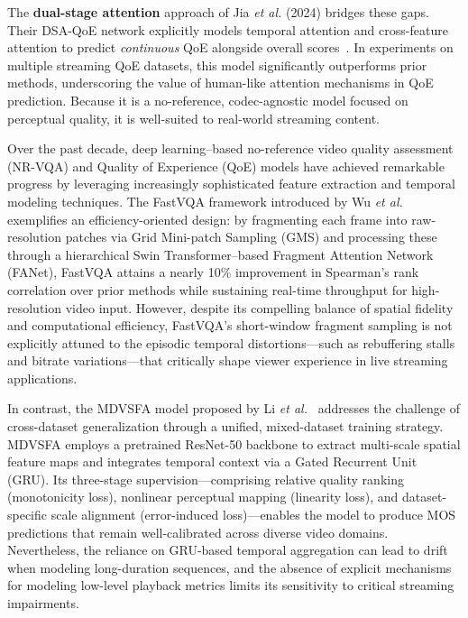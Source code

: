 The \textbf{dual-stage attention} approach of Jia \textit{et al.} (2024) bridges these gaps. Their DSA-QoE network explicitly models temporal attention and cross-feature attention to predict \textit{continuous} QoE alongside overall scores~\cite{jia2024continuous}. In experiments on multiple streaming QoE datasets, this model significantly outperforms prior methods, underscoring the value of human-like attention mechanisms in QoE prediction. Because it is a no-reference, codec-agnostic model focused on perceptual quality, it is well-suited to real-world streaming content.

Over the past decade, deep learning–based no-reference video quality assessment (NR-VQA) and Quality of Experience (QoE) models have achieved remarkable progress by leveraging increasingly sophisticated feature extraction and temporal modeling techniques. The FastVQA framework introduced by Wu \textit{et al.}~\cite{wu2022fastvqa} exemplifies an efficiency-oriented design: by fragmenting each frame into raw-resolution patches via Grid Mini-patch Sampling (GMS) and processing these through a hierarchical Swin Transformer–based Fragment Attention Network (FANet), FastVQA attains a nearly 10\% improvement in Spearman's rank correlation over prior methods while sustaining real-time throughput for high-resolution video input. However, despite its compelling balance of spatial fidelity and computational efficiency, FastVQA's short-window fragment sampling is not explicitly attuned to the episodic temporal distortions—such as rebuffering stalls and bitrate variations—that critically shape viewer experience in live streaming applications.

In contrast, the MDVSFA model proposed by Li \textit{et al.}~\cite{li2023unified} addresses the challenge of cross-dataset generalization through a unified, mixed-dataset training strategy. MDVSFA employs a pretrained ResNet-50 backbone to extract multi-scale spatial feature maps and integrates temporal context via a Gated Recurrent Unit (GRU). Its three-stage supervision—comprising relative quality ranking (monotonicity loss), nonlinear perceptual mapping (linearity loss), and dataset-specific scale alignment (error-induced loss)—enables the model to produce MOS predictions that remain well-calibrated across diverse video domains. Nevertheless, the reliance on GRU-based temporal aggregation can lead to drift when modeling long-duration sequences, and the absence of explicit mechanisms for modeling low-level playback metrics limits its sensitivity to critical streaming impairments.

